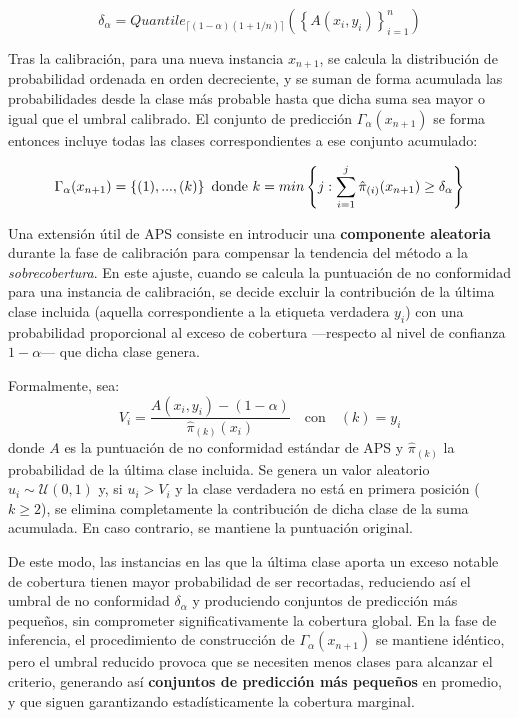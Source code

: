 $$
\delta_\alpha = Quantile_{ \lceil  (1-\alpha) (1 + 1/n)  \rceil } ( \left\{ A(x_i,y_i) \right\}_{i=1}^n )
$$

Tras la calibración, para una nueva instancia $x_{n+1}$, se calcula la distribución de probabilidad ordenada en orden decreciente, y se suman de forma acumulada las probabilidades desde la clase más probable hasta que dicha suma sea mayor o igual que el umbral calibrado. El conjunto de predicción $\Gamma_\alpha(x_{n+1})$ se forma entonces incluye todas las clases correspondientes a ese conjunto acumulado: 

$$
\Gamma_\alpha(x_{n+1}) = \left\{ (1),...,(k) \right\} \\ \textnormal{ donde } 
k = min\left\{ j: \sum_{i=1}^{j} \hat{\pi}_{(i)}(x_{n+1}) \ge \delta_\alpha \right\} 
$$

Una extensión útil de \acrshort{APS} consiste en introducir una \textbf{componente aleatoria} durante la fase de calibración para compensar la tendencia del método a la \textit{sobrecobertura}. En este ajuste, cuando se calcula la puntuación de no conformidad para una instancia de calibración, se decide excluir la contribución de la última clase incluida (aquella correspondiente a la etiqueta verdadera $y_i$) con una probabilidad proporcional al exceso de cobertura ---respecto al nivel de confianza $1-\alpha$--- que dicha clase genera.

Formalmente, sea:
$$
V_i = \frac{A(x_i, y_i) - (1-\alpha)}{\hat{\pi}_{(k)}(x_i)} \quad \text{con} \quad (k) = y_i
$$
donde $A$ es la puntuación de no conformidad estándar de \acrshort{APS} y $\hat{\pi}_{(k)}$ la probabilidad de la última clase incluida. Se genera un valor aleatorio $u_i \sim \mathcal{U}(0,1)$ y, si $u_i > V_i$ y la clase verdadera no está en primera posición ($k \ge 2$), se elimina completamente la contribución de dicha clase de la suma acumulada. En caso contrario, se mantiene la puntuación original.

De este modo, las instancias en las que la última clase aporta un exceso notable de cobertura tienen mayor probabilidad de ser recortadas, reduciendo así el umbral de no conformidad $\delta_\alpha$ y produciendo conjuntos de predicción más pequeños, sin comprometer significativamente la cobertura global. En la fase de inferencia, el procedimiento de construcción de $\Gamma_\alpha(x_{n+1})$ se mantiene idéntico, pero el umbral reducido provoca que se necesiten menos clases para alcanzar el criterio, generando así \textbf{conjuntos de predicción más pequeños} en promedio, y que siguen garantizando estadísticamente la cobertura marginal.

